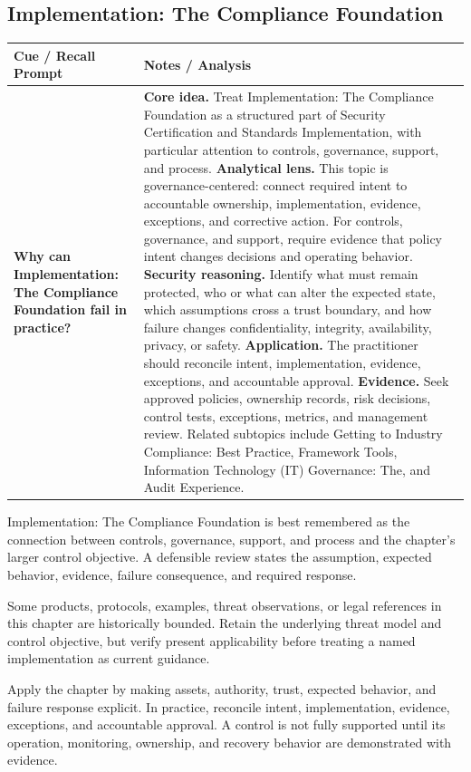 \documentclass[11pt]{article}
\newcommand{\CornellHeader}{%
\rowcolor{Navy}\color{white}\bfseries Cue / Recall Prompt & \color{white}\bfseries Notes / Analysis\\\hline}
\newcommand{\CornellRow}[2]{%
\cellcolor{CueGray}\RaggedRight\textbf{#1} & \RaggedRight #2\\\hline}
\begin{document}
\subsection*{Implementation: The Compliance Foundation}
\begin{longtable}{>{\RaggedRight\arraybackslash}p{}|>{\RaggedRight\arraybackslash}p{}}
\CornellHeader
\CornellRow{Why can Implementation: The Compliance Foundation fail in practice?}{\textbf{Core idea.} Treat Implementation: The Compliance Foundation as a structured part of Security Certification and Standards Implementation, with particular attention to controls, governance, support, and process. \textbf{Analytical lens.} This topic is governance-centered: connect required intent to accountable ownership, implementation, evidence, exceptions, and corrective action. For controls, governance, and support, require evidence that policy intent changes decisions and operating behavior. \textbf{Security reasoning.} Identify what must remain protected, who or what can alter the expected state, which assumptions cross a trust boundary, and how failure changes confidentiality, integrity, availability, privacy, or safety. \textbf{Application.} The practitioner should reconcile intent, implementation, evidence, exceptions, and accountable approval. \textbf{Evidence.} Seek approved policies, ownership records, risk decisions, control tests, exceptions, metrics, and management review. Related subtopics include Getting to Industry Compliance: Best Practice, Framework Tools, Information Technology (IT) Governance: The, and Audit Experience.}
\end{longtable}
\begin{topicsummary}
Implementation: The Compliance Foundation is best remembered as the connection between controls, governance, support, and process and the chapter's larger control objective. A defensible review states the assumption, expected behavior, evidence, failure consequence, and required response.
\end{topicsummary}
\begin{historybox}
Some products, protocols, examples, threat observations, or legal references in this chapter are historically bounded. Retain the underlying threat model and control objective, but verify present applicability before treating a named implementation as current guidance.
\end{historybox}
\begin{defensebox}
Apply the chapter by making assets, authority, trust, expected behavior, and failure response explicit. In practice, reconcile intent, implementation, evidence, exceptions, and accountable approval. A control is not fully supported until its operation, monitoring, ownership, and recovery behavior are demonstrated with evidence.
\end{defensebox}
\end{document}
